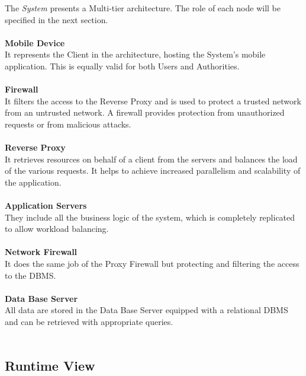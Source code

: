 \documentclass{article}
\begin{document}
	The {\it System} presents a Multi-tier architecture. The role of each node will be specified in the next section. \\ \\
			{\bf Mobile Device} \\
			It represents the Client in the architecture, hosting the System’s mobile application. This is equally valid for both Users and Authorities. \\ \\
			{\bf Firewall}\\
			It filters the access to the Reverse Proxy and is used to protect a trusted network from an untrusted network. A firewall provides protection from unauthorized requests or from malicious attacks. \\ \\
			{\bf Reverse Proxy}\\
			It retrieves resources on behalf of a client from the servers and balances the load of the various requests. It helps to achieve increased parallelism and scalability of the application. \\ \\
			{\bf Application Servers}\\
			They include all the business logic of the system, which is completely replicated to allow workload balancing. \\ \\
			{\bf Network Firewall}\\
			It does the same job of the Proxy Firewall but protecting and filtering the access to the DBMS. \\ \\
			{\bf Data Base Server}\\
			All data are stored in the Data Base Server equipped with a relational DBMS and can be retrieved with appropriate queries. \\ \\
	

	\subsection{Runtime View}
	
\end{document}
